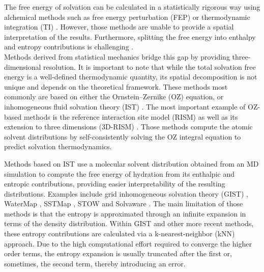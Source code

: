 \documentclass[9pt,tutorial]{livecoms}
\begin{document}
The free energy of solvation can be calculated in a statistically rigorous way using alchemical methods \cite{Liu2016-md-solubility,Mobley2009-dgsolv,Mobley2014-freesolv} such as free energy perturbation (FEP) \cite{Zwanzig1954-reweighting} or thermodynamic integration (TI) \cite{Kirkwood1935-ti}.
However, those methods are unable to provide a spatial interpretation of the results.
Furthermore, splitting the free energy into enthalpy and entropy contributions is challenging \cite{Peter2004-alchemical-entropy}.\\
Methods derived from statistical mechanics bridge this gap by providing three-dimensional resolution. 
It is important to note that while the total solvation free energy is a well-defined thermodynamic quantity, its spatial decomposition is not unique and depends on the theoretical framework\cite{Persson02092022}.
These methods most commonly are based on either the Ornstein–Zernike (OZ) equation, or \cite{Hansen2013-simple-liquids} inhomogeneous fluid solvation theory (IST) \cite{Lazaridis1998}.
The most important example of OZ-based methods is the reference interaction site model (RISM) \cite{Chandler1972-rism} as well as its extension to three dimensions (3D-RISM) \cite{Kovalenko1998-3drism}.
Those methods compute the atomic solvent distributions by self-consistently solving the OZ integral equation to predict solvation thermodynamics.

Methods based on IST use a molecular solvent distribution obtained from an MD simulation to compute the free energy of hydration from its enthalpic and entropic contributions, providing easier interpretability of the resulting distributions.
Examples include grid inhomogeneous solvation theory (GIST) \cite{Nguyen2012,Ramsey2016}, WaterMap \cite{Young2007-watermap,Abel2008-watermap}, SSTMap \cite{Haider2018-sstmap}, STOW \cite{Li2012-stow} and Solvaware \cite{Huggins2016-solvaware}.
The main limitation of those methods is that the entropy is approximated through an infinite expansion in terms of the density distribution. 
Within GIST and other more recent methods, these entropy contributions are calculated via a k-nearest-neighbor (kNN) approach.  
Due to the high computational effort required to converge the higher order terms, the entropy expansion is usually truncated after the first or, sometimes, the second \cite{Nguyen2016-gist-second-order,Waibl2022-gist-solvents} term, thereby introducing an error.
\end{document}
